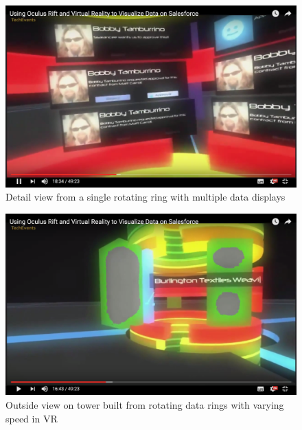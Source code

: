\begin{figure}[h]
	\begin{center}
		\includegraphics[width=14cm]{03_Figures/05_LitReview/CodeScience2015a.png}
		\caption[Detail view from a single rotating ring with multiple data displays]{Detail view from a single rotating ring with multiple data displays \citep{CodeScience2015}}
		\label{fig:rotatingringsdetail}
	\end{center}
\end{figure}


\begin{figure}[h]
	\begin{center}
		\includegraphics[width=14cm]{03_Figures/05_LitReview/CodeScience2015b.png}
		\caption[Outside view on tower built from rotating data rings with varying speed in VR]{Outside view on tower built from rotating data rings with varying speed in VR \citep{CodeScience2015}}
		\label{fig:rotatingringstower}
	\end{center}
\end{figure}



